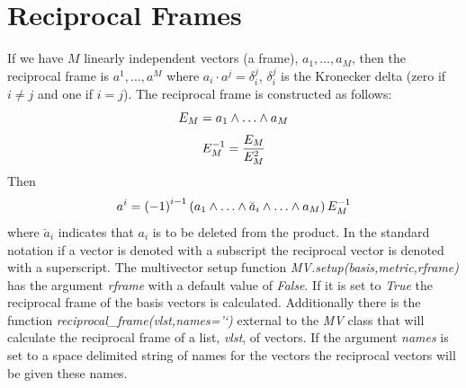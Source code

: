 \documentclass[letterpaper,10pt,english]{sphinxmanual}
\begin{document}
\chapter{Reciprocal Frames}
\label{GA:reciprocal-frames}\label{GA:recframe}
If we have $M$ linearly independent vectors (a frame),
$a_{1},\dots,a_{M}$, then the reciprocal frame is
$a^{1},\dots,a^{M}$ where $a_{i}\cdot a^{j} = \delta_{i}^{j}$,
$\delta_{i}^{j}$ is the Kronecker delta (zero if $i \ne j$ and one
if $i = j$). The reciprocal frame is constructed as follows:
\begin{equation*}
  E_{M} = a_{1}\W\dots\W a_{M}
\end{equation*}\begin{equation*}
  E_{M}^{-1} = \displaystyle\frac{E_{M}}{E_{M}^{2}}
\end{equation*}
Then
\begin{equation*}
  a^{i} = \lp -1\rp^{i-1}\lp a_{1}\W\dots\W \breve{a}_{i} \W\dots\W a_{M}\rp E_{M}^{-1}
\end{equation*}
where $\breve{a}_{i}$ indicates that $a_{i}$ is to be deleted from
the product.  In the standard notation if a vector is denoted with a subscript
the reciprocal vector is denoted with a superscript. The multivector setup
function \emph{MV.setup(basis,metric,rframe)} has the argument \emph{rframe} with a
default value of \emph{False}.  If it is set to \emph{True} the reciprocal frame of
the basis vectors is calculated. Additionally there is the function
\emph{reciprocal\_frame(vlst,names='`)} external to the \emph{MV} class that will
calculate the reciprocal frame of a list, \emph{vlst}, of vectors.  If the argument
\emph{names} is set to a space delimited string of names for the vectors the
reciprocal vectors will be given these names.
\end{document}
